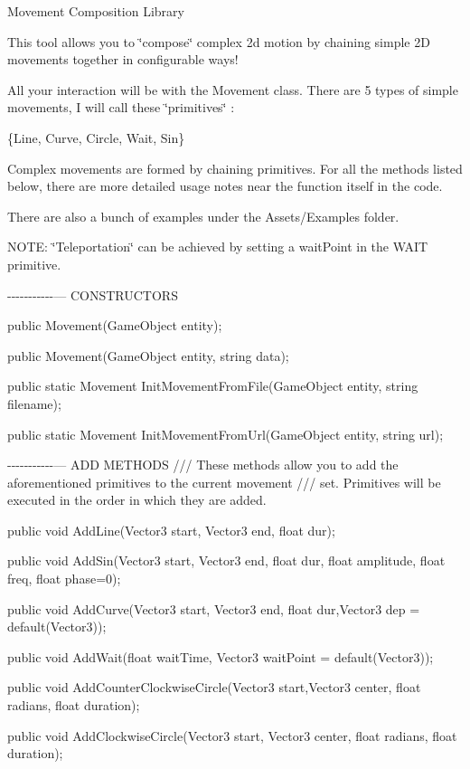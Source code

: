 Movement Composition Library

This tool allows you to \char`\"{}compose\char`\"{} complex 2d motion by chaining simple 2\+D movements together in configurable ways!

All your interaction will be with the Movement class. There are 5 types of simple movements, I will call these \char`\"{}primitives\char`\"{} \+:

\{Line, Curve, Circle, Wait, Sin\}

Complex movements are formed by chaining primitives. For all the methods listed below, there are more detailed usage notes near the function itself in the code.

There are also a bunch of examples under the Assets/\+Examples folder.

N\+O\+T\+E\+: \char`\"{}\+Teleportation\char`\"{} can be achieved by setting a wait\+Point in the W\+A\+I\+T primitive.

-\/-\/-\/-\/-\/-\/-\/-\/-\/-\/-\/--- C\+O\+N\+S\+T\+R\+U\+C\+T\+O\+R\+S

public Movement(\+Game\+Object entity);

public Movement(\+Game\+Object entity, string data);

public static Movement Init\+Movement\+From\+File(\+Game\+Object entity, string filename);

public static Movement Init\+Movement\+From\+Url(\+Game\+Object entity, string url);

-\/-\/-\/-\/-\/-\/-\/-\/-\/-\/-\/--- A\+D\+D M\+E\+T\+H\+O\+D\+S /// These methods allow you to add the aforementioned primitives to the current movement /// set. Primitives will be executed in the order in which they are added.

public void Add\+Line(\+Vector3 start, Vector3 end, float dur);

public void Add\+Sin(Vector3 start, Vector3 end, float dur, float amplitude, float freq, float phase=0);

public void Add\+Curve(Vector3 start, Vector3 end, float dur,Vector3 dep = default(\+Vector3));

public void Add\+Wait(float wait\+Time, Vector3 wait\+Point = default(\+Vector3));

public void Add\+Counter\+Clockwise\+Circle(\+Vector3 start,\+Vector3 center, float radians, float duration);

public void Add\+Clockwise\+Circle(\+Vector3 start, Vector3 center, float radians, float duration);

